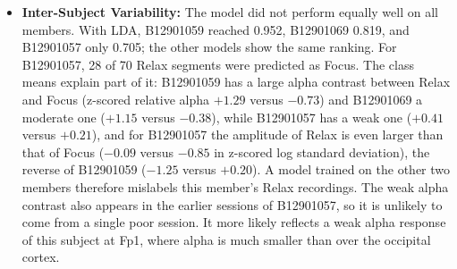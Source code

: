 \begin{itemize}[leftmargin=*]
\begin{itemize}
        \item \emph{Effect of our processing.} Counting the Relax and Focus errors of LDA at each ablation step (Table~\ref{tab:ablation}) shows where the improvement comes from. Of the 420 Relax and Focus segments, 176 were confused between the two states with the raw samples as input, 157 with the band-power features and 151 after adding the time-domain features, but only 58 after the subject-wise z-score. The two states differ mainly in the balance between alpha and beta, and this difference only becomes consistent across members once each member's baseline is removed. The time-domain features hardly help this pair (without them, the z-scored band-power features give 51 errors instead of 58), because both states have a below-average amplitude; their gain is in separating Stroop, where the errors between Relax and Stroop fall from 57 to 28. The other three models show the same trend, with 49 to 64 Relax and Focus errors in the final pipeline. No post-processing was used in the final code (Section~\ref{sec:method}), so the remaining 58 errors are still more than half of all LDA errors.
    \end{itemize}
    \item \textbf{Inter-Subject Variability:} The model did not perform equally well on all members. With LDA, B12901059 reached 0.952, B12901069 0.819, and B12901057 only 0.705; the other models show the same ranking. For B12901057, 28 of 70 Relax segments were predicted as Focus. The class means explain part of it: B12901059 has a large alpha contrast between Relax and Focus (z-scored relative alpha $+1.29$ versus $-0.73$) and B12901069 a moderate one ($+1.15$ versus $-0.38$), while B12901057 has a weak one ($+0.41$ versus $+0.21$), and for B12901057 the amplitude of Relax is even larger than that of Focus ($-0.09$ versus $-0.85$ in z-scored log standard deviation), the reverse of B12901059 ($-1.25$ versus $+0.20$). A model trained on the other two members therefore mislabels this member's Relax recordings. The weak alpha contrast also appears in the earlier sessions of B12901057, so it is unlikely to come from a single poor session. It more likely reflects a weak alpha response of this subject at Fp1, where alpha is much smaller than over the occipital cortex.

\end{itemize}
